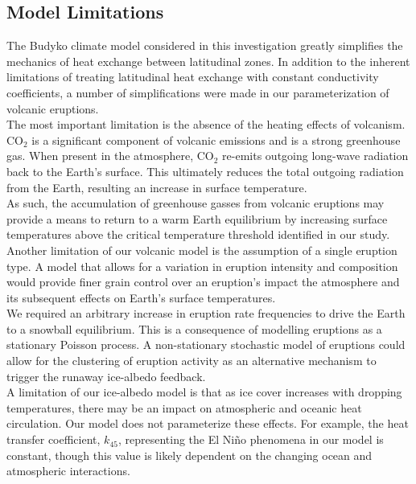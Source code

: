\documentclass[12pt]{article}
\begin{document}
\subsection{Model Limitations} \label{sec:Limitations}
The Budyko climate model considered in this investigation greatly simplifies the
mechanics of heat exchange between latitudinal zones. In addition to the inherent
limitations of treating latitudinal heat exchange with constant conductivity coefficients,
a number of simplifications were made in our parameterization of volcanic eruptions. \\

The most important limitation is the absence of the heating effects of volcanism.
CO$_2$ is a significant component of volcanic emissions and is a strong greenhouse
gas. When present in the atmosphere, CO$_2$ re-emits outgoing long-wave radiation
back to the Earth's surface. This ultimately reduces the total outgoing radiation
from the Earth, resulting an increase in surface temperature. \\

As such, the accumulation of greenhouse gasses from volcanic eruptions may provide
a means to return to a warm Earth equilibrium by increasing surface temperatures above
the critical temperature threshold identified in our study. \\

Another limitation of our volcanic model is the assumption of a single eruption
type. A model that allows for a variation in eruption intensity and composition
would provide finer grain control over an eruption's impact the atmosphere and
its subsequent effects on Earth's surface temperatures. \\

We required an arbitrary increase in eruption rate frequencies to drive the Earth
to a snowball equilibrium. This is a consequence of modelling eruptions as a stationary
Poisson process. A non-stationary stochastic model of eruptions could allow for the clustering
of eruption activity as an alternative mechanism to trigger the runaway ice-albedo
feedback. \\

A limitation of our ice-albedo model is that as ice cover increases with dropping
temperatures, there may be an impact on atmospheric and oceanic heat circulation.
Our model does not parameterize these effects. For example, the heat transfer
coefficient, $k_{45}$, representing the El Niño phenomena in our model is constant,
though this value is likely dependent on the changing ocean and atmospheric interactions.
\end{document}
